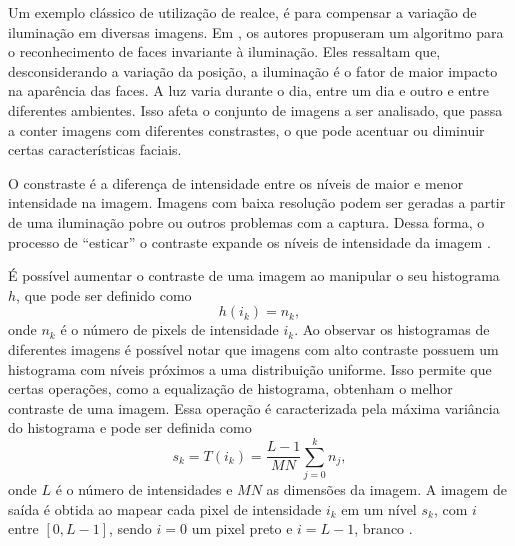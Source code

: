 Um exemplo clássico de utilização de realce, é para compensar a variação de iluminação em diversas imagens. Em , os autores propuseram um algoritmo para o reconhecimento de faces invariante à iluminação. Eles ressaltam que, desconsiderando a variação da posição, a iluminação é o fator de maior impacto na aparência das faces. A luz varia durante o dia, entre um dia e outro e entre diferentes ambientes. Isso afeta o conjunto de imagens a ser analisado, que passa a conter imagens com diferentes constrastes, o que pode acentuar ou diminuir certas características faciais.

O constraste é a diferença de intensidade entre os níveis de maior e menor intensidade na imagem. Imagens com baixa resolução podem ser geradas a partir de uma iluminação pobre ou outros problemas com a captura. Dessa forma, o processo de ``esticar'' o contraste expande os níveis de intensidade da imagem \cite{Gonzalez2007}.


É possível aumentar o contraste de uma imagem ao manipular o seu histograma $h$, que pode ser definido como
\begin{equation*}
h(i_k) = n_k,
\end{equation*}
\noindent onde $n_k$ é o número de pixels de intensidade $i_k$. Ao observar os histogramas de diferentes imagens é possível notar que imagens com alto contraste possuem um histograma com níveis próximos a uma distribuição uniforme. Isso permite que certas operações, como a equalização de histograma, obtenham o melhor contraste de uma imagem. Essa operação é caracterizada pela máxima variância do histograma e pode ser definida como
\begin{equation}
s_k = T(i_k) = \frac{L-1}{MN} \sum_{j=0}^{k}n_j,
\end{equation}
\noindent onde $L$ é o número de intensidades e $MN$ as dimensões da imagem. A imagem de saída é obtida ao mapear cada pixel de intensidade $i_k$ em um nível $s_k$, com $i$ entre $[0,L-1]$, sendo $i = 0$ um pixel preto e $i = L-1$, branco \cite{Gonzalez2007}.

